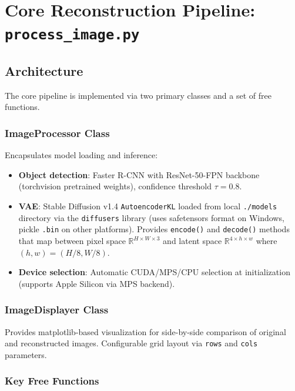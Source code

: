 \documentclass[11pt,a4paper]{article}
\begin{document}
\section{Core Reconstruction Pipeline: \texttt{process\_image.py}}

\subsection{Architecture}

The core pipeline is implemented via two primary classes and a set of free functions.

\subsubsection{ImageProcessor Class}

Encapsulates model loading and inference:
\begin{itemize}
  \item \textbf{Object detection}: Faster R-CNN with ResNet-50-FPN backbone (torchvision pretrained weights), confidence threshold $\tau = 0.8$.
  \item \textbf{VAE}: Stable Diffusion v1.4 \texttt{AutoencoderKL} loaded from local \texttt{./models} directory via the \texttt{diffusers} library (uses safetensors format on Windows, pickle \texttt{.bin} on other platforms). Provides \texttt{encode()} and \texttt{decode()} methods that map between pixel space $\mathbb{R}^{H \times W \times 3}$ and latent space $\mathbb{R}^{4 \times h \times w}$ where $(h, w) = (H/8, W/8)$.
  \item \textbf{Device selection}: Automatic CUDA/MPS/CPU selection at initialization (supports Apple Silicon via MPS backend).
\end{itemize}

\subsubsection{ImageDisplayer Class}

Provides matplotlib-based visualization for side-by-side comparison of original and reconstructed images. Configurable grid layout via \texttt{rows} and \texttt{cols} parameters.

\subsubsection{Key Free Functions}
\end{document}
